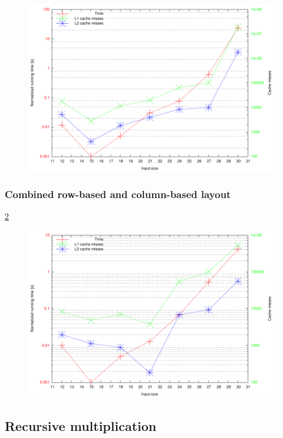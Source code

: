\begin{figure}[h!]
  \centering
  \includegraphics[width=\textwidth]{rnrnrn0.pdf}
  \label{fig:rnrnrn0}
\end{figure}

\subsubsection{Combined row-based and column-based layout}

\ref{fig:rncnrn0}

\begin{figure}[h!]
  \centering
  \includegraphics[width=\textwidth]{rncnrn0.pdf}
  \label{fig:rncnrn0}
\end{figure}

\subsection{Recursive multiplication}

